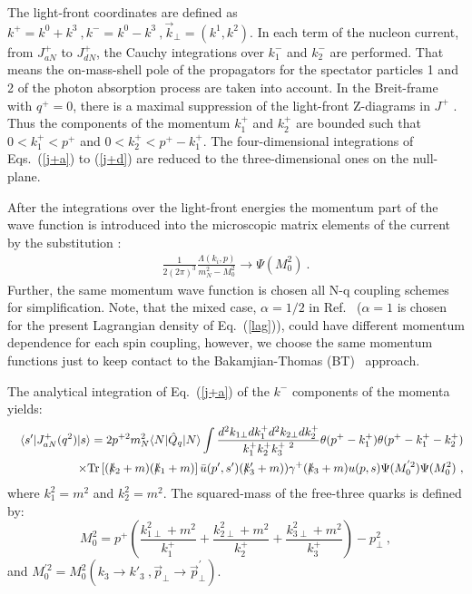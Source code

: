 \documentclass[preprint,aps,showpacs,floatfix]{revtex4}
\begin{document}
\begin{appendix}
The light-front coordinates are defined as $k^+=k^0+k^3\ ,
k^-=k^0-k^3 \ , \vec{k}_\perp=(k^1,k^2).$ In each term of the nucleon
current, from $J^+_{aN}$ to $J^+_{dN}$, the Cauchy integrations
over $k^-_1$ and $k^-_2$ are performed.  That means the
on-mass-shell pole of the propagators for the spectator
particles 1 and 2 of the photon absorption process are taken into
account.  In the Breit-frame with $q^+=0$, there is a maximal
suppression of the light-front Z-diagrams in $J^+$
\cite{tob92,pach99}.  Thus the components of the momentum $k^+_1$
and $k^+_2$ are bounded such that $ 0< k^+_1 < p^+$ and $0<k^+_2
<p^+-k^+_1$. The four-dimensional integrations of Eqs.~(\ref{j+a})
to (\ref{j+d}) are reduced to the three-dimensional ones on the
null-plane.

After the integrations over the light-front energies the momentum
part of the wave function is introduced into the microscopic
matrix elements of the current by the substitution
\cite{afsbw,tob92}:
\begin{eqnarray}
\frac{1}{2(2\pi)^3} \frac{\Lambda(k_i,p)}{m^2_N-M^2_0}\rightarrow
\Psi (M^2_0) \ .
\end{eqnarray}
Further, the same momentum wave function is chosen all N-q
coupling schemes for simplification. Note, that the mixed case, 
$\alpha=1/2$ in Ref.~\cite{afsbw} ($\alpha=1$ is chosen for the present 
Lagrangian density of Eq.~(\ref{lag})), 
could have different momentum dependence for
each spin coupling, however, we choose the same momentum functions
just to keep contact to the Bakamjian-Thomas (BT)~\cite{Bakamjian1953} approach.

The analytical integration of Eq.~(\ref{j+a}) of the $k^-$
components of the momenta yields:
\begin{eqnarray}
&&\langle s'|J^+_{a N}(q^2)|s\rangle = 2p^{+2}m_N^2 \langle N|\hat
Q_q|N\rangle \int \frac{d^{2} k_{1\perp} dk^{+}_1d^{2} k_{2\perp}
d k^{+}_2 }{k^+_1k^+_2k^{+\ 2}_3} \theta(p^+-k^+_1)
\theta(p^+-k^+_1-k^+_2)
\nonumber \\
&&\times {\mathrm{Tr}} \left[ (\rlap\slash k_2+m) (\rlap\slash k_1+m)\right]
\bar u(p',s')(\rlap\slash k'_3+m))\gamma^+(\rlap\slash
k_3+m)u(p,s) \Psi (M^{'2}_0) \Psi (M^2_0)
 \ ,
\label{j+alf}
\end{eqnarray}
where $k^2_1=m^2$ and $k^2_2=m^2$. The  
squared-mass of the free-three quarks is defined by:
\begin{equation}
M^2_0=p^+(\frac{k_{1\perp}^{2}+m^2}{k^+_1}+\frac{k_{2\perp}^{2}+m^2}{k^+_2}
+\frac{k_{3\perp}^{2}+m^2}{k^+_3})-{p^2_\perp} \ , \label{eqn:M0}
\end{equation}
and $M^{\prime 2}_0=M^2_0(k_3\rightarrow k'_3 \ , \vec
p_\perp\rightarrow \vec p^\prime_\perp)$.


\end{appendix}
\end{document}
